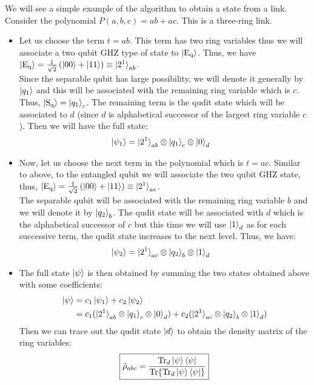 \documentclass{scrartcl}
\begin{document}
We will see a simple example of the algorithm to obtain a state from a link. Consider the polynomial $P(a,b,c) = ab+ac$. This is a three-ring link. 
\begin{itemize}
    \item Let us choose the term $t = ab$. This term has two ring variables thus we will associate a two qubit GHZ type of state to $\ket{\mathrm{E_q}}$. Thus, we have $\ket{\mathrm{E_q}} = \frac{1}{\sqrt{2}}\left( \ket{00} + \ket{11} \right)\equiv \ket{2^1}_{ab}$. \\[0.3cm]Since the separable qubit has large possibility, we will denote it generally by $\ket{q_1}$ and this will be associated with the remaining ring variable which is $c$. Thus, $\ket{\mathrm{S_q}} = \ket{q_1}_c$. The remaining term is the qudit state which will be associated to $d$ (since $d$ is alphabetical successor of the largest ring variable $c$). Then we will have the full state:
\begin{align*}
    \ket{\psi_1} &= \ket{2^1}_{ab}\otimes\ket{q_1}_c\otimes\ket{0}_d 
\end{align*}
\item Now, let us choose the next term in the polynomial which is $t = ac$. Similar to above, to the entangled qubit we will associate the two qubit GHZ state, thus, $\ket{\mathrm{E_q}} = \frac{1}{\sqrt{2}}\left( \ket{00} + \ket{11} \right)\equiv \ket{2^1}_{ac}$.\\[0.3cm] The separable qubit will be associated with the remaining ring variable $b$ and we will denote it by $\ket{q_2}_b$. The qudit state will be associated with $d$ which is the alphabetical successor of $c$ but this time we will use $\ket{1}_d$ as for each successive term, the qudit state increases to the next level. Thus, we have:
\begin{align*}
    \ket{\psi_2} &= \ket{2^1}_{ac}\otimes\ket{q_2}_b\otimes\ket{1}_d
\end{align*}
\item The full state $\ket{\psi}$ is then obtained by summing the two states obtained above with some coefficients:
\begin{align*}
    \ket{\psi} &= c_1\ket{\psi_1} + c_2\ket{\psi_2} \\
    &=c_1(\ket{2^1}_{ab}\otimes\ket{q_1}_c\otimes\ket{0}_d )+ c_2(\ket{2^1}_{ac}\otimes\ket{q_2}_b\otimes\ket{1}_d)
\end{align*}
Then we can trace out the qudit state $\ket{d}$ to obtain the density matrix of the ring variables:
$$\boxed{\hat{\rho}_{abc}=\frac{\Tr_d{\ket{\psi}\bra{\psi}}}{\Tr{\Tr_d{\ket{\psi}\bra{\psi}}}}} $$
\end{itemize}
\end{document}

